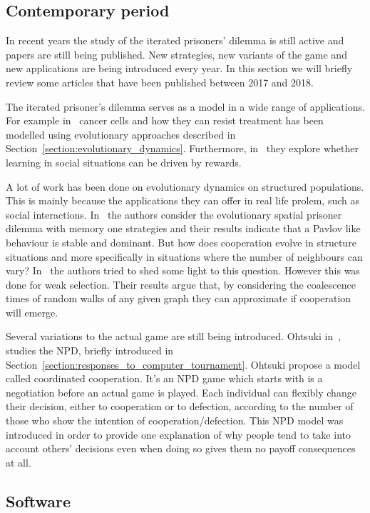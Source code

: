 \documentclass{article}
\theoremstyle{definition}
\begin{document}
\subsection{Contemporary period}\label{section:contemporary_period}

In recent years the study of the iterated prisoners' dilemma is still active
and papers are still being published. New strategies, new variants of the game
and new applications are being introduced every year. In this section we will
briefly review some articles that have been published between 2017 and 2018.

The iterated prisoner's dilemma serves as a model in a wide range of applications.
For example in~\cite{Kaznatchee2017} cancer cells and how they can resist treatment has been
modelled using evolutionary approaches described in Section~\ref{section:evolutionary_dynamics}.
Furthermore, in~\cite{Dridi2018} they explore whether learning in social situations
can be driven by rewards.

A lot of work has been done on evolutionary dynamics on structured populations.
This is mainly because the applications they can offer in real life prolem,
such as social interactions.
In~\cite{Liu2017} the authors consider the evolutionary spatial prisoner dilemma with
memory one strategies and their results indicate that a Pavlov like behaviour
is stable and dominant. But how does cooperation evolve in structure situations
and more specifically in situations where the number of neighbours can vary?
In~\cite{Allen2017} the authors tried to shed some light to this question.
However this was done for weak selection. Their results argue that, by considering
the coalescence times of random walks of any given graph they can approximate if
cooperation will emerge.

Several variations to the actual game are still being introduced. Ohtsuki in~\cite{Ohtsuki2018},
studies the NPD, briefly introduced in Section~\ref{section:responses_to_computer_tournament}.
Ohtsuki propose a model called coordinated cooperation. It's an NPD game
which starts with is a negotiation before an actual game is played. Each individual
can flexibly change their decision, either to cooperation or to defection,
according to the number of those who show the intention of cooperation/defection.
This NPD model was introduced in order to provide one explanation of why
people tend to take into account others' decisions even when doing so gives them
no payoff consequences at all.

\subsection{Software}
\end{document}
